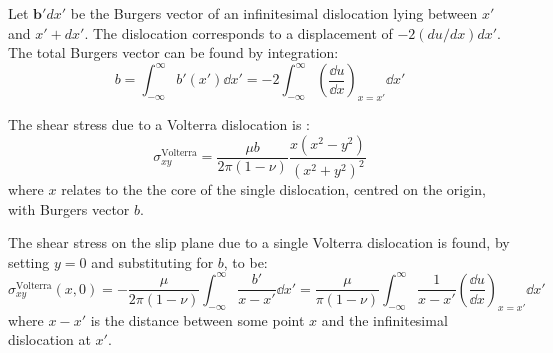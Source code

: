 Let $\mathbf{b}'dx'$ be the Burgers vector of an infinitesimal dislocation lying between $x'$ and $x'+dx'$. The dislocation corresponds to a displacement of $-2(du/dx)dx'$. The total Burgers vector can be found by integration:
\begin{equation}
b = \int_{-\infty}^{\infty} b'(x') \dd x' = -2\int^{\infty}_{-\infty} \left( \! \frac{\dd u}{\dd x} \right)_{x=x'} \dd x' 
\end{equation}

The shear stress due to a Volterra dislocation  is \cite{hirth_lothe1982peierls_displacements}:
\begin{equation}
\sigma^{\text{Volterra}}_{xy} = \frac{\mu b}{2\pi (1-\nu)} \frac{x(x^2 - y^2)}{(x^2+y^2)^2}
\end{equation}
where $x$ relates to the the core of the single dislocation, centred on the origin, with Burgers vector $b$.

The shear stress on the slip plane due to a single Volterra dislocation is found, by setting $y=0$ and substituting for $b$, to be:
\begin{equation}
\sigma^{\text{Volterra}}_{xy}(x,0) = -\frac{\mu}{2\pi(1-\nu)} \int^{\infty}_{-\infty} \frac{b'}{x-x'} \!\dd x' =  \frac{\mu}{\pi(1-\nu)} \int^{\infty}_{-\infty} \frac{1}{x-x'} \left(\!\frac{\dd u}{\dd x}\right)_{x=x'} \!\dd x'
\label{eqn:elastic_stress_at_slip_plane}
\end{equation}
where $x-x'$ is the distance between some point $x$ and the infinitesimal dislocation at $x'$.

